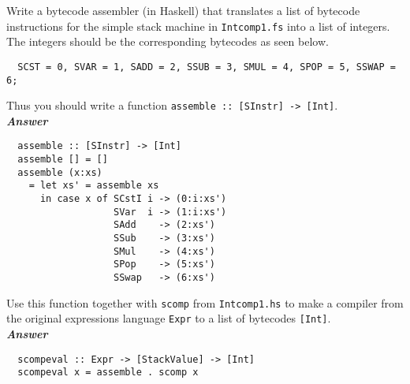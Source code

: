 \documentclass[a4paper]{article}
\begin{document}
\begin{exercise}\label{exer-comp-expr-to-ints}
  Write a bytecode assembler (in Haskell) that translates a list
  of bytecode instructions for the simple stack machine in
  \texttt{Intcomp1.fs} into a list of integers.  The integers should be
  the corresponding bytecodes as seen below.
  {\codesetup\begin{verbatim}
  SCST = 0, SVAR = 1, SADD = 2, SSUB = 3, SMUL = 4, SPOP = 5, SSWAP = 6;\end{verbatim}}
  \noindent 
  Thus you should write a function
  \texttt{assemble ::\ [SInstr] -> [Int]}.\\
  
  \noindent
\textbf{\emph{Answer}}
  {\codesetup\begin{verbatim}
  assemble :: [SInstr] -> [Int]
  assemble [] = []
  assemble (x:xs) 
    = let xs' = assemble xs 
      in case x of SCstI i -> (0:i:xs')
                   SVar  i -> (1:i:xs')
                   SAdd    -> (2:xs')
                   SSub    -> (3:xs')
                   SMul    -> (4:xs')
                   SPop    -> (5:xs')
                   SSwap   -> (6:xs')
  \end{verbatim}}

  Use this function together with \texttt{scomp} from
  \texttt{Intcomp1.hs} to make a compiler from the original expressions
  language \texttt{Expr} to a list of bytecodes \texttt{[Int]}.\\
  
  \noindent
\textbf{\emph{Answer}}
  {\codesetup\begin{verbatim}
  scompeval :: Expr -> [StackValue] -> [Int]
  scompeval x = assemble . scomp x
  \end{verbatim}}

\end{exercise}
\end{document}

